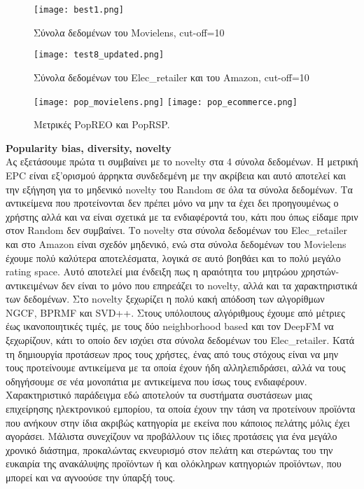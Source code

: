 \begin{figure}[H]
	\centering
	\texttt{[image: best1.png]}
	\vspace*{-10mm}
	\caption{Σύνολα δεδομένων του Movielens, cut-off=10}
	\label{fig:best1}
\end{figure}
\begin{figure}[H]
	\centering
	\texttt{[image: test8\_updated.png]}
		\vspace*{-10mm}
		\caption{Σύνολα δεδομένων του Elec\_retailer και του Amazon, cut-off=10}
	\label{fig:best2}
\end{figure}

\begin{figure}[H]
	\centering
	\texttt{[image: pop\_movielens.png]}
	\texttt{[image: pop\_ecommerce.png]}
	\vspace*{-10mm}
	\caption{Μετρικές PopREO και PopRSP.}
	\label{fig:pop_metrics}
\end{figure}
\noindent\textbf{Popularity bias, diversity, novelty}\\
\noindent Ας εξετάσουμε πρώτα τι συμβαίνει με το novelty στα 4 σύνολα δεδομένων. Η μετρική EPC είναι εξ'ορισμού άρρηκτα συνδεδεμένη με την ακρίβεια και αυτό αποτελεί και την εξήγηση για το μηδενικό novelty του Random σε όλα τα σύνολα δεδομένων. Τα αντικείμενα που προτείνονται δεν πρέπει μόνο να μην τα έχει δει προηγουμένως ο χρήστης αλλά και να είναι σχετικά με τα ενδιαφέροντά του, κάτι που όπως είδαμε πριν στον Random δεν συμβαίνει. Το novelty στα σύνολα δεδομένων του Elec\_retailer και στο Amazon είναι σχεδόν μηδενικό, ενώ στα σύνολα δεδομένων του Movielens έχουμε πολύ καλύτερα αποτελέσματα, λογικά σε αυτό βοηθάει και το πολύ μεγάλο rating space. Αυτό αποτελεί μια ένδειξη πως η αραιότητα του μητρώου χρηστών-αντικειμένων δεν είναι το μόνο που επηρεάζει το novelty, αλλά και τα χαρακτηριστικά των δεδομένων.
Στο novelty ξεχωρίζει η πολύ κακή απόδοση των αλγορίθμων NGCF, BPRMF και SVD++. Στους υπόλοιπους αλγόριθμους έχουμε από μέτριες έως ικανοποιητικές τιμές, με τους δύο neighborhood based και τον DeepFM να ξεχωρίζουν, κάτι το οποίο δεν ισχύει στα σύνολα δεδομένων του Elec\_retailer. Κατά τη δημιουργία προτάσεων προς τους χρήστες, ένας από τους στόχους είναι να μην τους προτείνουμε αντικείμενα με τα οποία έχουν ήδη αλληλεπιδράσει, αλλά να τους οδηγήσουμε σε νέα μονοπάτια με αντικείμενα που ίσως τους ενδιαφέρουν. Χαρακτηριστικό παράδειγμα εδώ αποτελούν τα συστήματα συστάσεων μιας επιχείρησης ηλεκτρονικού εμπορίου, τα οποία έχουν την τάση να προτείνουν προϊόντα που ανήκουν στην ίδια ακριβώς κατηγορία με εκείνα που κάποιος πελάτης μόλις έχει αγοράσει. Μάλιστα συνεχίζουν να προβάλλουν τις ίδιες προτάσεις για ένα μεγάλο χρονικό διάστημα, προκαλώντας εκνευρισμό στον πελάτη και στερώντας του την ευκαιρία της ανακάλυψης προϊόντων ή και ολόκληρων κατηγοριών προϊόντων, που μπορεί και να αγνοούσε την ύπαρξή τους.

